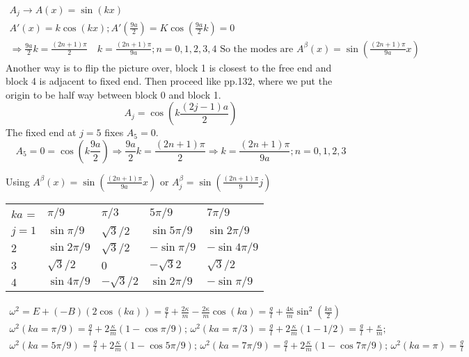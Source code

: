 \documentclass[twoside,10pt]{amsart}
\begin{document}
\[
\begin{gathered}
  A_j \to A(x) = \sin{ (kx) }  \\
  A'(x) = k\cos{(kx)}; A'\left(\frac{9a}{2} \right) = K\cos{ \left( \frac{9a}{2} k \right) } = 0 \\
  \Longrightarrow \frac{ 9a}{2} k = \frac{ (2n+1) \pi}{ 2} \quad k = \frac{ (2n+1) \pi}{ 9a}; n = 0,1,2,3,4
\text{ So the modes are } A^{\beta}(x) = \sin{ \left( \frac{(2n+1) \pi}{ 9a} x \right) }
\end{gathered}
\]
Another way is to flip the picture over, block 1 is closest to the free end and block 4 is adjacent to fixed end.  Then proceed like pp.132, where we put the origin to be half way between block 0 and block 1.  
\[
A_j = \cos{ \left( k \frac{ (2j-1)a}{2} \right) }  
\]
The fixed end at $j=5$ fixes $A_5 =0$.  
\[
A_5 = 0 = \cos{ \left( k \frac{ 9a}{2} \right) } \Longrightarrow \frac{9a}{2} k = \frac{ (2n+1)\pi }{2} \Longrightarrow k = \frac{ (2n+1)\pi}{9a} ; n=0,1,2,3
\]

Using $A^{\beta}(x) = \sin{ \left( \frac{(2n+1)\pi}{9a} x \right) }$ or $A^{\beta}_j = \sin{ \left( \frac{(2n+1)\pi}{9} j \right) }$


    \begin{tabular}{ l l l l l  }     
     $ ka$ =  & $\pi/9$ & $\pi/3$ & $5\pi/9$ & $7\pi/9$  \\
      $ j =     1$ & $\sin{ \pi/9}$ & $\sqrt{3}/2$ & $\sin{5\pi/9}$ & $\sin{2\pi/9}$ \\   
          $ 2$ & $\sin{ 2\pi/9}$ &  $\sqrt{3}/2$ & $-\sin{\pi/9}$ & $-\sin{4\pi/9}$ \\
       $3$ & $\sqrt{3}/2$ & $0$ & $-\sqrt{3}{2}$ & $\sqrt{3}/2$ \\
       $4$ & $\sin{4\pi/9}$ & $- \sqrt{3}/2$ & $\sin{2\pi/9}$ & $-\sin{\pi/9}$
    \end{tabular}

\[
\begin{gathered}
  \omega^2 = E + (-B) (2 \cos{ (ka)} ) = \frac{g}{l} + \frac{ 2\kappa}{m} - \frac{2\kappa}{m}\cos{ (ka)} = \frac{g}{l} + \frac{4 \kappa}{m} \sin^2{\left( \frac{ka}{2} \right) }  \\
  \omega^2(ka=\pi/9) = \frac{g}{l} + 2\frac{\kappa}{m} (1- \cos{\pi/9} ); \,   \omega^2(ka=\pi/3) = \frac{g}{l} + 2\frac{\kappa}{m} (1- 1/2 ) = \frac{g}{l} +  \frac{\kappa}{m} ; \,   \\
  \omega^2(ka=5\pi/9) = \frac{g}{l} + 2\frac{\kappa}{m} (1- \cos{5\pi/9} ); \,   \omega^2(ka=7\pi/9) = \frac{g}{l} + 2\frac{\kappa}{m} (1- \cos{7\pi/9} ); \,   \omega^2(ka=\pi) = \frac{g}{l} 
\end{gathered}
\]
\end{document}
